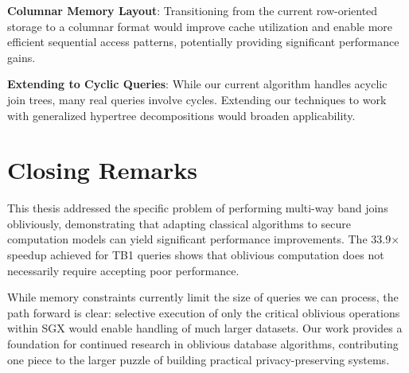 \textbf{Columnar Memory Layout}: Transitioning from the current row-oriented storage to a columnar format would improve cache utilization and enable more efficient sequential access patterns, potentially providing significant performance gains.

\textbf{Extending to Cyclic Queries}: While our current algorithm handles acyclic join trees, many real queries involve cycles. Extending our techniques to work with generalized hypertree decompositions would broaden applicability.

\section{Closing Remarks}

This thesis addressed the specific problem of performing multi-way band joins obliviously, demonstrating that adapting classical algorithms to secure computation models can yield significant performance improvements. The 33.9× speedup achieved for TB1 queries shows that oblivious computation does not necessarily require accepting poor performance.

While memory constraints currently limit the size of queries we can process, the path forward is clear: selective execution of only the critical oblivious operations within SGX would enable handling of much larger datasets. Our work provides a foundation for continued research in oblivious database algorithms, contributing one piece to the larger puzzle of building practical privacy-preserving systems.